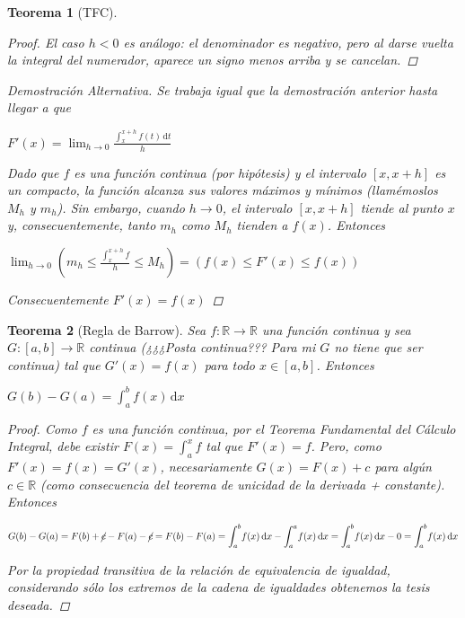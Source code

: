 \documentclass[]{article}
\newtheorem{teo}{Teorema}
\def\R{\mathbb{R}}
\newcommand{\integral}[4]{\int_{#1}^{#2} \! #3 \, \mathrm{d}#4}
\newcommand{\intres}[3]{\int_{#1}^{#2} \! #3}
\begin{document}
\begin{teo}[TFC]
\begin{proof}
		El caso $h<0$ es análogo: el denominador es negativo, pero al darse vuelta la integral del numerador, aparece un signo menos arriba y se cancelan.
	\end{proof}		
	\begin{proof}[Demostración Alternativa]
		Se trabaja igual que la demostración anterior hasta llegar a que
		\begin{center}
			$\displaystyle F'(x) = \lim_{h\to 0}\frac{\integral{x}{x+h}{f(t)}{t}}{h}$
		\end{center}
		
		Dado que $f$ es una función continua (por hipótesis) y el intervalo $[x,x+h]$ es un compacto, la función alcanza sus valores máximos y mínimos (llamémoslos $M_h$ y $m_h$). Sin embargo, cuando $h\to 0$, el intervalo $[x,x+h]$ tiende al punto $x$ y, consecuentemente, tanto $m_h$ como $M_h$ tienden a $f(x)$. Entonces
		\begin{center}
			$\displaystyle \lim_{h\to 0} \left(m_h \leq \frac{\intres{x}{x+h}{f}}{h} \leq M_h\right) = \left(f(x) \leq F'(x) \leq f(x)\right)$
		\end{center}
		Consecuentemente $F'(x) = f(x)$
		\end{proof}
\end{teo}

\begin{teo}[Regla de Barrow]
	Sea $f:\R\to\R$ una función continua y sea $G:[a,b]\to\R$ continua (¿¿¿Posta continua??? Para mi $G$ no tiene que ser continua) tal que $G'(x) = f(x)$ para todo $x\in[a,b]$. Entonces
	\begin{center}
		$\displaystyle G(b)-G(a) = \integral{a}{b}{f(x)}{x}$
	\end{center}
	\begin{proof}
		Como $f$ es una función continua, por el Teorema Fundamental del Cálculo Integral, debe existir $F(x)=\intres{a}{x}{f}$ tal que $F'(x)=f$. Pero, como $F'(x) = f(x) = G'(x)$, necesariamente $G(x) = F(x)+c$ para algún $c\in\R$ (como consecuencia del teorema de unicidad de la derivada + constante). Entonces
		\begin{center}
			$\displaystyle G(b) - G(a) = F(b) + \cancel{c} - F(a)-\cancel{c} = F(b) - F(a) = \integral{a}{b}{f(x)}{x} - \integral{a}{a}{f(x)}{x} = \integral{a}{b}{f(x)}{x} - 0 = \integral{a}{b}{f(x)}{x}$
		\end{center}
		
		Por la propiedad transitiva de la relación de equivalencia de igualdad, considerando sólo los extremos de la cadena de igualdades obtenemos la tesis deseada.
	\end{proof}
\end{teo}
\end{document}

